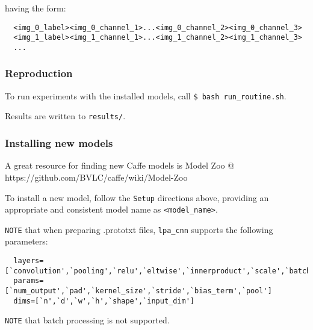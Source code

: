 having the form:

\begin{verbatim}
  <img_0_label><img_0_channel_1>...<img_0_channel_2><img_0_channel_3>
  <img_1_label><img_1_channel_1>...<img_1_channel_2><img_1_channel_3>
  ...
\end{verbatim}

\subsubsection{\texorpdfstring{\textbf{Reproduction}}{Reproduction}}\label{reproduction}

To run experiments with the installed models, call
\texttt{\$\ bash\ run\_routine.sh}.

Results are written to \texttt{results/}.

\subsubsection{\texorpdfstring{\textbf{Installing new
models}}{Installing new models}}\label{installing-new-models}

A great resource for finding new Caffe models is Model Zoo @
https://github.com/BVLC/caffe/wiki/Model-Zoo

To install a new model, follow the \texttt{Setup} directions above,
providing an appropriate and consistent model name as
\texttt{\textless{}model\_name\textgreater{}}.

\texttt{NOTE} that when preparing .prototxt files, \texttt{lpa\_cnn}
supports the following parameters:

\begin{verbatim}
  layers=[`convolution',`pooling',`relu',`eltwise',`innerproduct',`scale',`batchnorm']
  params=[`num_output',`pad',`kernel_size',`stride',`bias_term',`pool']
  dims=[`n',`d',`w',`h',`shape',`input_dim']
\end{verbatim}

\texttt{NOTE} that batch processing is not supported.

